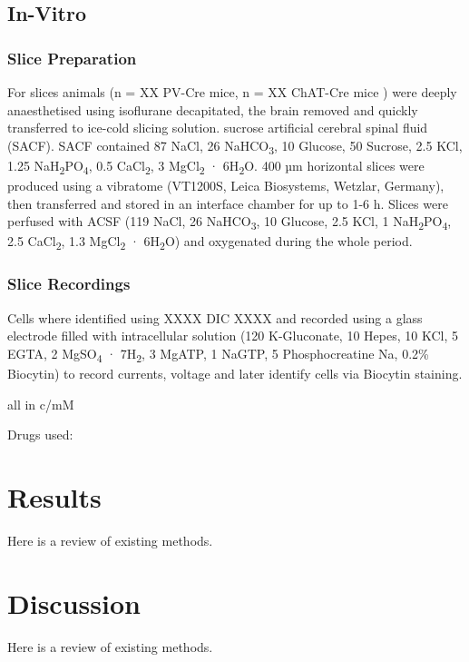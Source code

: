 \documentclass[
  12pt,
]{book}
\begin{document}
\hypertarget{in-vitro}{%
\section{In-Vitro}\label{in-vitro}}

\hypertarget{slice-preparation}{%
\subsection{Slice Preparation}\label{slice-preparation}}

For slices animals (n = XX PV-Cre mice, n = XX ChAT-Cre mice ) were deeply anaesthetised using isoflurane decapitated, the brain removed and quickly transferred to ice-cold slicing solution. sucrose artificial cerebral spinal fluid (SACF). SACF contained 87 NaCl, 26 NaHCO\textsubscript{3}, 10 Glucose, 50 Sucrose, 2.5 KCl, 1.25 NaH\textsubscript{2}PO\textsubscript{4}, 0.5 CaCl\textsubscript{2}, 3 MgCl\textsubscript{2} · 6H\textsubscript{2}O.
400 µm horizontal slices were produced using a vibratome (VT1200S, Leica Biosystems, Wetzlar, Germany), then transferred and stored in an interface chamber for up to 1-6 h. Slices were perfused with ACSF (119 NaCl, 26 NaHCO\textsubscript{3}, 10 Glucose, 2.5 KCl, 1 NaH\textsubscript{2}PO\textsubscript{4}, 2.5 CaCl\textsubscript{2}, 1.3 MgCl\textsubscript{2} · 6H\textsubscript{2}O) and oxygenated during the whole period.

\hypertarget{slice-recordings}{%
\subsection{Slice Recordings}\label{slice-recordings}}

Cells where identified using XXXX DIC XXXX and recorded using a glass electrode filled with intracellular solution (120 K-Gluconate, 10 Hepes, 10 KCl, 5 EGTA, 2 MgSO\textsubscript{4} · 7H\textsubscript{2}, 3 MgATP, 1 NaGTP, 5 Phosphocreatine Na, 0.2\% Biocytin) to record currents, voltage and later identify cells via Biocytin staining.

all in c/mM

Drugs used:

\hypertarget{results}{%
\chapter{Results}\label{results}}

Here is a review of existing methods.

\hypertarget{discussion}{%
\chapter{Discussion}\label{discussion}}

Here is a review of existing methods.

  
\end{document}
